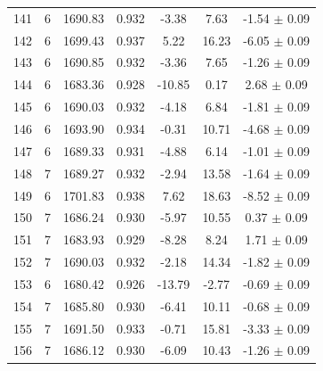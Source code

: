 \begin{longtable}{c c c c c c c}
    141 & 6 & 1690.83 & 0.932 & \cellcolor{aiclightyellow}-3.38 & \cellcolor{aiclightred}7.63 & \cellcolor{aicorange}-1.54 $\pm$ 0.09 \\
    142 & 6 & 1699.43 & 0.937 & \cellcolor{aicorange}5.22 & \cellcolor{aicred}16.23 & \cellcolor{aicred}-6.05 $\pm$ 0.09 \\
    143 & 6 & 1690.85 & 0.932 & \cellcolor{aiclightyellow}-3.36 & \cellcolor{aiclightred}7.65 & \cellcolor{aicorange}-1.26 $\pm$ 0.09 \\
    144 & 6 & 1683.36 & 0.928 & \cellcolor{aicgreen}-10.85 & 0.17 & \cellcolor{aicyellow}2.68 $\pm$ 0.09 \\
    145 & 6 & 1690.03 & 0.932 & \cellcolor{aicyellow}-4.18 & \cellcolor{aiclightred}6.84 & \cellcolor{aicorange}-1.81 $\pm$ 0.09 \\
    146 & 6 & 1693.90 & 0.934 & -0.31 & \cellcolor{aicred}10.71 & \cellcolor{aiclightred}-4.68 $\pm$ 0.09 \\
    147 & 6 & 1689.33 & 0.931 & \cellcolor{aicyellow}-4.88 & \cellcolor{aiclightred}6.14 & \cellcolor{aicorange}-1.01 $\pm$ 0.09 \\
    148 & 7 & 1689.27 & 0.932 & \cellcolor{aiclightyellow}-2.94 & \cellcolor{aicred}13.58 & \cellcolor{aicorange}-1.64 $\pm$ 0.09 \\
    149 & 6 & 1701.83 & 0.938 & \cellcolor{aiclightred}7.62 & \cellcolor{aicred}18.63 & \cellcolor{aicred}-8.52 $\pm$ 0.09 \\
    150 & 7 & 1686.24 & 0.930 & \cellcolor{aicyellow}-5.97 & \cellcolor{aicred}10.55 & 0.37 $\pm$ 0.09 \\
    151 & 7 & 1683.93 & 0.929 & \cellcolor{aiclightgreen}-8.28 & \cellcolor{aiclightred}8.24 & \cellcolor{aicyellow}1.71 $\pm$ 0.09 \\
    152 & 7 & 1690.03 & 0.932 & \cellcolor{aiclightyellow}-2.18 & \cellcolor{aicred}14.34 & \cellcolor{aicorange}-1.82 $\pm$ 0.09 \\
    153 & 6 & 1680.42 & 0.926 & \cellcolor{aicgreen}-13.79 & \cellcolor{aiclightyellow}-2.77 & -0.69 $\pm$ 0.09 \\
    154 & 7 & 1685.80 & 0.930 & \cellcolor{aicyellow}-6.41 & \cellcolor{aicred}10.11 & -0.68 $\pm$ 0.09 \\
    155 & 7 & 1691.50 & 0.933 & -0.71 & \cellcolor{aicred}15.81 & \cellcolor{aiclightred}-3.33 $\pm$ 0.09 \\
    156 & 7 & 1686.12 & 0.930 & \cellcolor{aicyellow}-6.09 & \cellcolor{aicred}10.43 & \cellcolor{aicorange}-1.26 $\pm$ 0.09 \\

\end{longtable}

